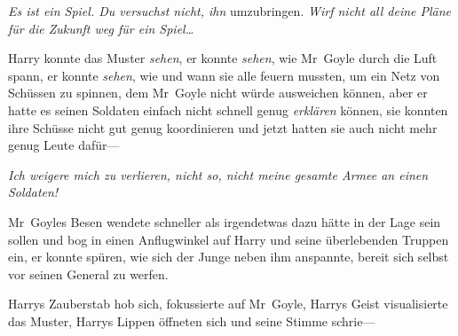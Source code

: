 \emph{Es ist ein Spiel. Du versuchst nicht, ihn} umzubringen. \emph{Wirf nicht all deine Pläne für die Zukunft weg für ein Spiel…}

Harry konnte das Muster \emph{sehen}, er konnte \emph{sehen}, wie Mr~Goyle durch die Luft spann, er konnte \emph{sehen}, wie und wann sie alle feuern mussten, um ein Netz von Schüssen zu spinnen, dem Mr~Goyle nicht würde ausweichen können, aber er hatte es seinen Soldaten einfach nicht schnell genug \emph{erklären} können, sie konnten ihre Schüsse nicht gut genug koordinieren und jetzt hatten sie auch nicht mehr genug Leute dafür—

\emph{Ich weigere mich zu verlieren, nicht so, nicht meine gesamte Armee an einen Soldaten!}

Mr~Goyles Besen wendete schneller als irgendetwas dazu hätte in der Lage sein sollen und bog in einen Anflugwinkel auf Harry und seine überlebenden Truppen ein, er konnte spüren, wie sich der Junge neben ihm anspannte, bereit sich selbst vor seinen General zu werfen.

\emph{}

Harrys Zauberstab hob sich, fokussierte auf Mr~Goyle, Harrys Geist visualisierte das Muster, Harrys Lippen öffneten sich und seine Stimme schrie—


